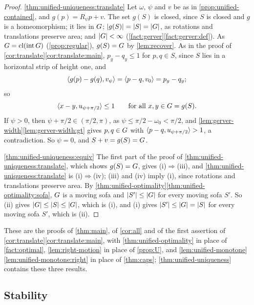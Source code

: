 \begin{proof}
\ref{thm:unified-uniqueness:translate} Let $\omega$, $\psi$ and $v$ be as in
\cref{prop:unified-contained}, and $g(p)=R_\psi p+v$. The set $g(S)$ is closed,
since $S$ is closed and $g$ is a homeomorphism; it lies in $G$;
$\lvert g(S)\rvert=\lvert S\rvert=\lvert G\rvert$, as rotations and translations preserve area; and
$\lvert G\rvert<\infty$ (\cref{fact:gerver}\ref{fact:gerver:def}). As
$G=\operatorname{cl}(\operatorname{int}G)$ (\cref{prop:regular}), $g(S)=G$ by \cref{lem:recover}.
As in the proof of \cref{cor:translate}\ref{cor:translate:main}, $p_y-q_y\le1$
for $p,q\in S$, since $S$ lies in a horizontal strip of height one, and
\[
  \langle g(p)-g(q),v_\psi\rangle=\langle p-q,v_0\rangle=p_y-q_y;
\]
so
\[
  \langle x-y,u_{\psi+\pi/2}\rangle\le1\qquad\text{for all }x,y\in G=g(S).
\]
If $\psi>0$, then $\psi+\pi/2\in(\pi/2,\pi)$, as $\psi\le\pi/2-\omega_0<\pi/2$,
and \cref{lem:gerver-width}\ref{lem:gerver-width:gt} gives $p,q\in G$ with
$\langle p-q,u_{\psi+\pi/2}\rangle>1$, a contradiction. So $\psi=0$, and
$S+v=g(S)=G$.

\ref{thm:unified-uniqueness:equiv} The first part of the proof of
\ref{thm:unified-uniqueness:translate}, which shows $g(S)=G$, gives
(i)$\Rightarrow$(iii), and \ref{thm:unified-uniqueness:translate} is
(i)$\Rightarrow$(iv); (iii) and (iv) imply (i), since rotations and
translations preserve area. By
\cref{thm:unified-optimality}\ref{thm:unified-optimality:sofa}, $G$ is a
moving sofa and $\lvert S'\rvert\le\lvert G\rvert$ for every moving sofa $S'$. So (ii) gives
$\lvert G\rvert\le\lvert S\rvert\le\lvert G\rvert$, which is (i), and (i) gives
$\lvert S'\rvert\le\lvert G\rvert=\lvert S\rvert$ for every moving sofa $S'$, which is (ii).
\end{proof}

These are the proofs of \cref{thm:main}, of \cref{cor:all} and of the first
assertion of \cref{cor:translate}\ref{cor:translate:main}, with
\cref{thm:unified-optimality} in place of \cref{fact:optimal},
\cref{lem:right-motion} in place of \cref{prop:U}, and
\cref{lem:unified-monotone}\ref{lem:unified-monotone:right} in place of
\cref{thm:caps}; \cref{thm:unified-uniqueness} contains these three results.

\subsection{Stability}\label{sec:unified-stability}

